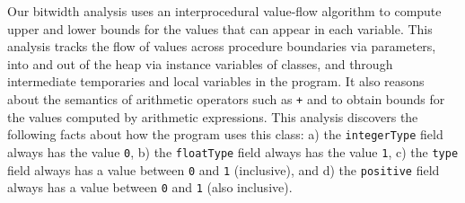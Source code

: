 \documentclass{acmconf}
\begin{document}
Our bitwidth analysis uses an interprocedural
value-flow algorithm to compute upper and lower bounds for the
values that can appear in each variable. This analysis tracks
the flow of values across procedure boundaries via parameters,
into and out of the heap via instance variables of classes, and through
intermediate temporaries and local variables in the program.
It also reasons about the semantics of arithmetic operators such
as {\tt +} and {\tt *} to obtain bounds for the values computed
by arithmetic expressions. 
This analysis discovers the following facts about 
how the program uses this class: a) the {\tt integerType} 
field always has the value {\tt 0}, b) the {\tt floatType} 
field always has the value {\tt 1}, c) the {\tt type} 
field always has a value between {\tt 0} and {\tt 1} (inclusive),
and d) the {\tt positive} field always has a value between 
{\tt 0} and {\tt 1} (also inclusive).
\end{document}
